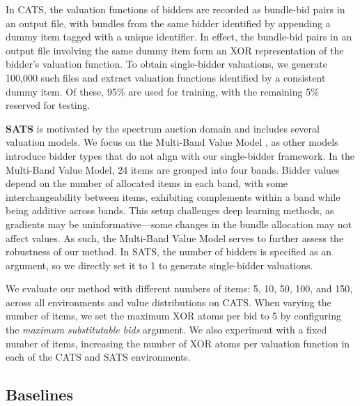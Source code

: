 In CATS, the valuation functions of bidders are recorded as bundle-bid pairs in an output file, with bundles from the same bidder identified by appending a dummy item tagged with a unique identifier. In effect, the bundle-bid pairs in an output file involving the same dummy item form an XOR representation of the bidder's valuation function. 
To obtain single-bidder valuations, we generate 100,000 such files and  extract valuation functions identified by a consistent dummy item. Of these, 95\% are used for training, with the remaining 5\% reserved for testing.

\textbf{SATS} is motivated by the spectrum auction domain and includes several valuation models. We focus on the Multi-Band Value Model \citep{bichler2013core}, %
as other models 
introduce bidder types that do not align with our single-bidder framework. In the Multi-Band Value Model, 24 items are grouped into four bands. Bidder values depend on the number of allocated items in each band, with some interchangeability between items, exhibiting complements within a band while being additive across bands.
This setup challenges deep learning methods, as gradients may be uninformative---some changes in the bundle allocation may not affect values. As such, the Multi-Band Value Model serves to further assess the robustness of our method.
In SATS, the number of bidders is specified as an argument, so we directly set it to 1 to generate single-bidder valuations.

We evaluate our method with different numbers of items: 5, 10, 50, 100, and 150, across all environments and value distributions  on CATS. When varying the number of items, we set the maximum XOR atoms per bid to 5 by configuring the  \emph{maximum substitutable bids} argument. We also experiment with a fixed number of items, increasing the number of XOR atoms per valuation function in each of the CATS and SATS environments.


\subsection{Baselines}

